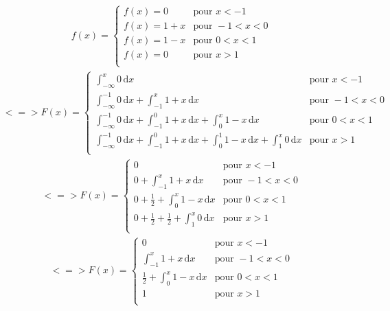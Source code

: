 \documentclass{article}
\begin{document}
\begin{align}
f(x)=\left\{
	\begin{array}{llll}
		f(x)=0 &\mbox{pour } x<-1\\
		f(x)=1+x & \mbox{pour } -1<x<0 \\
		f(x)=1-x & \mbox{pour } 0<x<1 \\
		f(x)=0 & \mbox{pour } x>1 \\
	\end{array}
\right. 
\end{align}
\begin{align}
<=>
F(x)=\left\{
	\begin{array}{llll}
		\displaystyle \int_{- \infty }^{x} 0 \, \mathrm{d}x &\mbox{pour } x<-1\\
		\displaystyle \int_{- \infty }^{-1} 0 \, \mathrm{d}x+\displaystyle \int_{-1 }^{x} 1+x \, \mathrm{d}x &\mbox{pour } -1<x<0\\
		\displaystyle \int_{- \infty }^{-1} 0 \, \mathrm{d}x+\displaystyle \int_{-1 }^{0} 1+x \, \mathrm{d}x + \displaystyle \int_{0}^{x} 1-x \, \mathrm{d}x &\mbox{pour } 0<x<1\\
		\displaystyle \int_{- \infty }^{-1} 0 \, \mathrm{d}x+\displaystyle \int_{-1 }^{0} 1+x \, \mathrm{d}x + \displaystyle \int_{0}^{1} 1-x \, \mathrm{d}x+\displaystyle \int_{1}^{x} 0 \, \mathrm{d}x &\mbox{pour } x>1\\
	\end{array}
\right. 
\end{align}
\begin{align}
<=>
F(x)=\left\{
	\begin{array}{llll}
		0 &\mbox{pour } x<-1\\
		0 + \displaystyle \int_{-1 }^{x} 1+x \, \mathrm{d}x &\mbox{pour } -1<x<0\\
		0+\frac{1}{2}+\displaystyle \int_{0}^{x} 1-x \, \mathrm{d}x &\mbox{pour } 0<x<1\\
		0+\frac{1}{2}+\frac{1}{2}+\displaystyle \int_{1}^{x} 0 \, \mathrm{d}x &\mbox{pour } x>1\\
	\end{array}
\right. 
\end{align}
\begin{align}
<=>
F(x)=\left\{
	\begin{array}{llll}
		0 &\mbox{pour } x<-1\\
		\displaystyle \int_{-1 }^{x} 1+x \, \mathrm{d}x &\mbox{pour } -1<x<0\\
		\frac{1}{2}+\displaystyle \int_{0}^{x} 1-x \, \mathrm{d}x &\mbox{pour } 0<x<1\\
		1 &\mbox{pour } x>1\\
	\end{array}
\right. 
\end{align}
\end{document}
